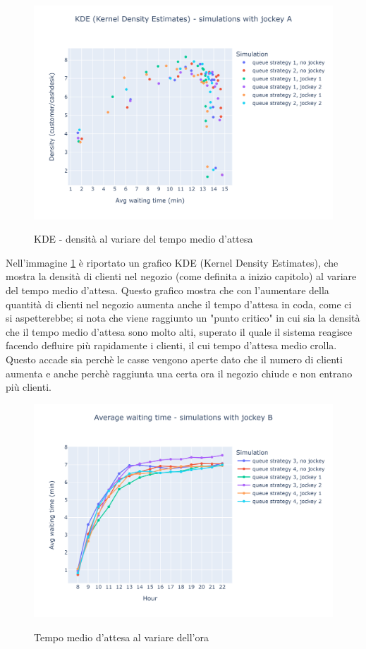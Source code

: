 \begin{figure}[H]
	\centering
	\includegraphics[width=12cm]{"images/results/kde_jockey_a.png"}
	\label{fig:kde_jockey_a}
	\caption{KDE - densità al variare del tempo medio d'attesa}
\end{figure}

Nell'immagine \ref{fig:kde_jockey_a} è riportato un grafico KDE (Kernel Density Estimates), che mostra la densità di clienti nel negozio (come definita a inizio capitolo) al variare del tempo medio d'attesa. Questo grafico mostra che con l'aumentare della quantità di clienti nel negozio aumenta anche il tempo d'attesa in coda, come ci si aspetterebbe; si nota che viene raggiunto un "punto critico" in cui sia la densità che il tempo medio d'attesa sono molto alti, superato il quale il sistema reagisce facendo defluire più rapidamente i clienti, il cui tempo d'attesa medio crolla. Questo accade sia perchè le casse vengono aperte dato che il numero di clienti aumenta e anche perchè raggiunta una certa ora il negozio chiude e non entrano più clienti.

\begin{figure}[H]
	\centering
	\includegraphics[width=12cm]{"images/results/avg_wt_jockey_b.png"}
	\label{fig:avg_wt_jockey_b}
	\caption{Tempo medio d'attesa al variare dell'ora}
\end{figure}

